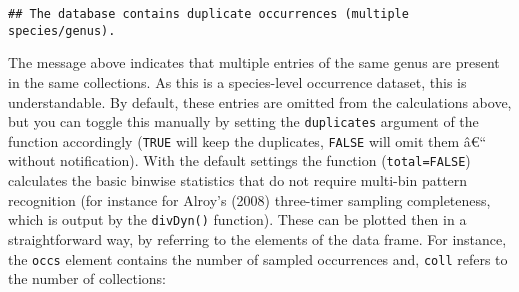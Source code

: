 \documentclass[]{article}
\newenvironment{Shaded}{\begin{snugshade}}{\end{snugshade}}
\newcommand{\CommentTok}[1]{\textcolor[rgb]{0.56,0.35,0.01}{\textit{#1}}}
\newcommand{\DataTypeTok}[1]{\textcolor[rgb]{0.13,0.29,0.53}{#1}}
\newcommand{\DecValTok}[1]{\textcolor[rgb]{0.00,0.00,0.81}{#1}}
\newcommand{\KeywordTok}[1]{\textcolor[rgb]{0.13,0.29,0.53}{\textbf{#1}}}
\newcommand{\NormalTok}[1]{#1}
\newcommand{\OperatorTok}[1]{\textcolor[rgb]{0.81,0.36,0.00}{\textbf{#1}}}
\newcommand{\StringTok}[1]{\textcolor[rgb]{0.31,0.60,0.02}{#1}}
\begin{document}
\begin{verbatim}
## The database contains duplicate occurrences (multiple species/genus).
\end{verbatim}

The message above indicates that multiple entries of the same genus are
present in the same collections. As this is a species-level occurrence
dataset, this is understandable. By default, these entries are omitted
from the calculations above, but you can toggle this manually by setting
the \texttt{duplicates} argument of the function accordingly
(\texttt{TRUE} will keep the duplicates, \texttt{FALSE} will omit them
â€`` without notification). With the default settings the function
(\texttt{total=FALSE}) calculates the basic binwise statistics that do
not require multi-bin pattern recognition (for instance for Alroy's
(2008) three-timer sampling completeness, which is output by the
\texttt{divDyn()} function). These can be plotted then in a
straightforward way, by referring to the elements of the data frame. For
instance, the \texttt{occs} element contains the number of sampled
occurrences and, \texttt{coll} refers to the number of collections:

\begin{Shaded}
\end{Shaded}
\end{document}
